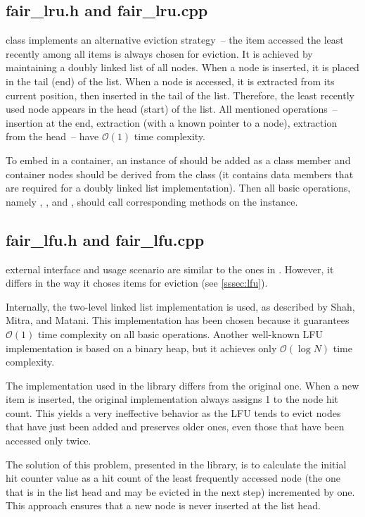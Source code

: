 \subsection{fair\_lru.h and fair\_lru.cpp}
 class implements an alternative eviction strategy~-- the item accessed the least recently among all items is always chosen for eviction. It is achieved by maintaining a doubly linked list of all nodes. When a node is inserted, it is placed in the tail (end) of the list. When a node is accessed, it is extracted from its current position, then inserted in the tail of the list. Therefore, the least recently used node appears in the head (start) of the list. All mentioned operations~-- insertion at the end, extraction (with a known pointer to a node), extraction from the head~-- have $\mathcal{O}(1)$ time complexity.

To embed  in a container, an instance of  should be added as a class member and container nodes should be derived from the  class (it contains data members that are required for a doubly linked list implementation). Then all basic operations, namely \findop, \insertop, and \removeop, should call corresponding methods on the  instance.

\subsection{fair\_lfu.h and fair\_lfu.cpp}
 external interface and usage scenario are similar to the ones in . However, it differs in the way it choses items for eviction (see \cref{sssec:lfu}).

Internally, the two-level linked list implementation is used, as described by Shah, Mitra, and Matani\cite{lfu}. This implementation has been chosen because it guarantees $\mathcal{O}(1)$ time complexity on all basic operations. Another well-known LFU implementation is based on a binary heap, but it achieves only $\mathcal{O}(\log N)$ time complexity.

The implementation used in the library differs from the original one. When a new item is inserted, the original implementation always assigns 1 to the node hit count. This yields a very ineffective behavior as the LFU tends to evict nodes that have just been added and preserves older ones, even those that have been accessed only twice.

The solution of this problem, presented in the library, is to calculate the initial hit counter value as a hit count of the least frequently accessed node (the one that is in the list head and may be evicted in the next step) incremented by one. This approach ensures that a new node is never inserted at the list head.


